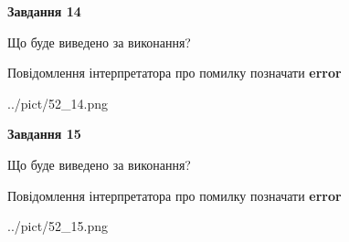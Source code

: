 \documentclass[11pt, ukrainian]{article}
\begin{document}
{\begin {large}
{\begin {center}\textbf{Завдання 14}\end {center}}\par
Що буде виведено за виконання? \par
Повідомлення інтерпретатора про помилку позначати \textbf{error}

\begin{center}
	{../pict/52_14.png}
\end{center}
\newpage

{\begin {center}\textbf{Завдання 15}\end {center}}\par
Що буде виведено за виконання? \par
Повідомлення інтерпретатора про помилку позначати \textbf{error}

\begin{center}
	{../pict/52_15.png}
\end{center}
\newpage

\end {large}}
\end{document}
